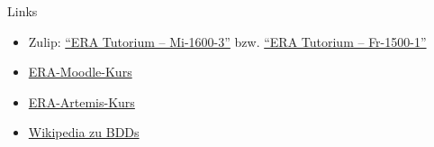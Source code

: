 \begin{frame}[c, fragile]{Links}{}
	\begin{itemize}
		\item Zulip: \href{https://zulip.in.tum.de/#narrow/channel/3255-ERA-Tutorium-.E2.80.93-Mi-1600-3}{\enquote{ERA Tutorium -- Mi-1600-3}}
		      bzw. \href{https://zulip.in.tum.de/#narrow/channel/3264-ERA-Tutorium-.E2.80.93-Fr-1500-1}{\enquote{ERA Tutorium -- Fr-1500-1}}
		\item \href{https://www.moodle.tum.de/course/view.php?id=111440}{ERA-Moodle-Kurs}
		\item \href{https://artemis.tum.de/courses/516}{ERA-Artemis-Kurs}
		\item \href{https://en.wikipedia.org/wiki/Binary_decision_diagram}{Wikipedia zu BDDs}
	\end{itemize}
\end{frame}

\maketitle


